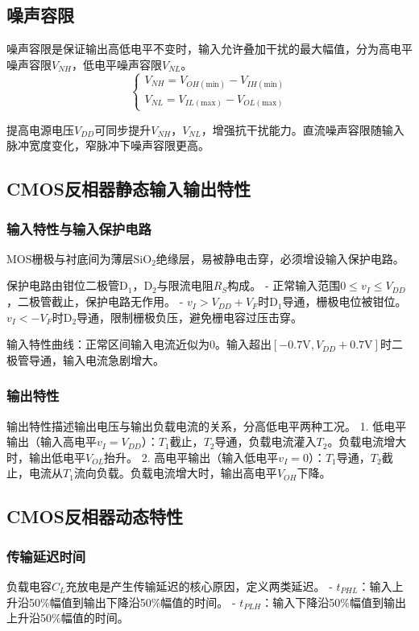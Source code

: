 \subsection{噪声容限}
噪声容限是保证输出高低电平不变时，输入允许叠加干扰的最大幅值，分为高电平噪声容限\(V_{NH}\)，低电平噪声容限\(V_{NL}\)。
\[
\begin{cases}
V_{NH}=V_{OH(\text{min})}-V_{IH(\text{min})}\\
V_{NL}=V_{IL(\text{max})}-V_{OL(\text{max})}
\end{cases}
\]

提高电源电压\(V_{DD}\)可同步提升\(V_{NH}\)，\(V_{NL}\)，增强抗干扰能力。直流噪声容限随输入脉冲宽度变化，窄脉冲下噪声容限更高。

\subsection{CMOS反相器静态输入输出特性}
\subsubsection{输入特性与输入保护电路}
MOS栅极与衬底间为薄层\(\mathrm{SiO_2}\)绝缘层，易被静电击穿，必须增设输入保护电路。

保护电路由钳位二极管\(\mathrm{D_1}\)，\(\mathrm{D_2}\)与限流电阻\(R_S\)构成。
- 正常输入范围\(0 \le v_I \le V_{DD}\)，二极管截止，保护电路无作用。
- \(v_I > V_{DD}+V_F\)时\(\mathrm{D_1}\)导通，栅极电位被钳位。\(v_I < -V_F\)时\(\mathrm{D_2}\)导通，限制栅极负压，避免栅电容过压击穿。

输入特性曲线：正常区间输入电流近似为0。输入超出\([-0.7\mathrm{V},V_{DD}+0.7\mathrm{V}]\)时二极管导通，输入电流急剧增大。

\subsubsection{输出特性}
输出特性描述输出电压与输出负载电流的关系，分高低电平两种工况。
1. 低电平输出（输入高电平\(v_I=V_{DD}\)）：\(T_1\)截止，\(T_2\)导通，负载电流灌入\(T_2\)。负载电流增大时，输出低电平\(V_{OL}\)抬升。
2. 高电平输出（输入低电平\(v_I=0\)）：\(T_1\)导通，\(T_2\)截止，电流从\(T_1\)流向负载。负载电流增大时，输出高电平\(V_{OH}\)下降。

\subsection{CMOS反相器动态特性}
\subsubsection{传输延迟时间}
负载电容\(C_L\)充放电是产生传输延迟的核心原因，定义两类延迟。
- \(t_{PHL}\)：输入上升沿50\%幅值到输出下降沿50\%幅值的时间。
- \(t_{PLH}\)：输入下降沿50\%幅值到输出上升沿50\%幅值的时间。

